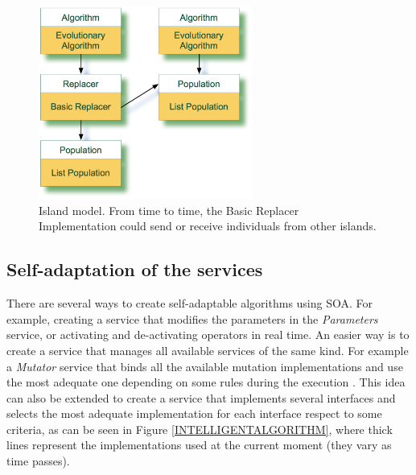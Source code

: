 \begin{figure}
\centering
\includegraphics[width=7cm]{gfx/soaea/island.jpg}
\caption{Island model. From time to time, the Basic Replacer Implementation could send or receive individuals from other islands.}
\label{POPULATION}
\end{figure}



\subsection{Self-adaptation of the services}
\label{sec:otherexamples}
There are several ways to create self-adaptable algorithms using SOA. For example, creating a service that modifies the parameters in the {\em Parameters} service, or activating and de-activating operators in real time. An easier way is to create a service that manages all available services of the same kind. For example a {\em Mutator} service that binds all the available mutation implementations and use the most adequate one depending on some rules during the execution \cite{SelfadaptationSerpell2010}.  This idea can also be extended to create a service that implements several interfaces and selects the most adequate implementation for each interface respect to some criteria, as can be seen in Figure \ref{INTELLIGENTALGORITHM}, where thick lines represent the implementations used at the current moment (they vary as time passes).



